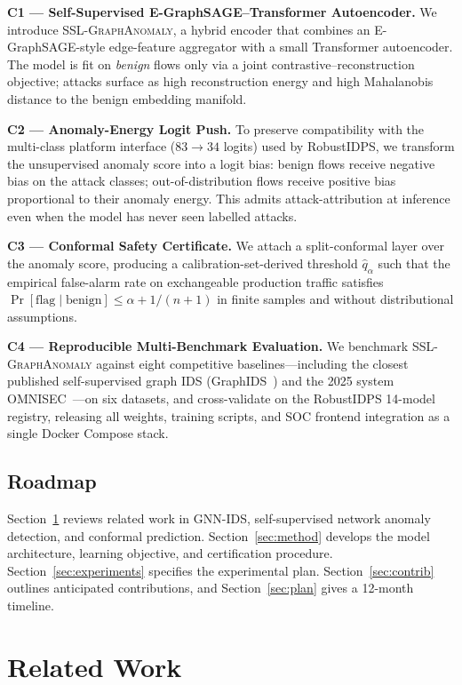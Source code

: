 \documentclass[journal,twoside]{IEEEtran}
\begin{document}
\textbf{C1 — Self-Supervised E-GraphSAGE--Transformer Autoencoder.}
We introduce \textsc{SSL-GraphAnomaly}, a hybrid encoder that combines an
E-GraphSAGE-style edge-feature aggregator with a small Transformer
autoencoder.  The model is fit on \emph{benign} flows only via a joint
contrastive--reconstruction objective; attacks surface as high reconstruction
energy and high Mahalanobis distance to the benign embedding manifold.

\textbf{C2 — Anomaly-Energy Logit Push.}
To preserve compatibility with the multi-class platform interface
($83 \to 34$ logits) used by RobustIDPS, we transform the unsupervised
anomaly score into a logit bias: benign flows receive negative bias on the
attack classes; out-of-distribution flows receive positive bias proportional
to their anomaly energy.  This admits attack-attribution at inference even
when the model has never seen labelled attacks.

\textbf{C3 — Conformal Safety Certificate.}
We attach a split-conformal layer over the anomaly score, producing a
calibration-set-derived threshold $\hat{q}_\alpha$ such that the empirical
false-alarm rate on exchangeable production traffic satisfies $\Pr[\text{flag}
\mid \text{benign}] \le \alpha + 1/(n+1)$ in finite samples and without
distributional assumptions.

\textbf{C4 — Reproducible Multi-Benchmark Evaluation.}
We benchmark \textsc{SSL-GraphAnomaly} against eight competitive
baselines---including the closest published self-supervised graph IDS
(GraphIDS~\cite{nguyen2025graphids}) and the 2025 system
OMNISEC~\cite{omnisec2025}---on six datasets, and cross-validate on the
RobustIDPS 14-model registry, releasing all weights, training scripts, and
SOC frontend integration as a single Docker Compose stack.

\subsection{Roadmap}
Section~\ref{sec:related} reviews related work in GNN-IDS, self-supervised
network anomaly detection, and conformal prediction.  Section~\ref{sec:method}
develops the model architecture, learning objective, and certification
procedure.  Section~\ref{sec:experiments} specifies the experimental plan.
Section~\ref{sec:contrib} outlines anticipated contributions, and
Section~\ref{sec:plan} gives a 12-month timeline.

\section{Related Work}
\label{sec:related}
\end{document}
